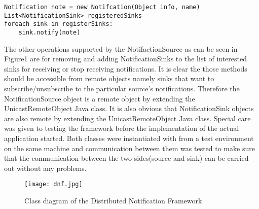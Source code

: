 \documentclass[a4paper,12pt,titlepage]{article}
\begin{document}
\begin{lstlisting}
Notification note = new Notifcation(Object info, name)
List<NotificationSink> registeredSinks
foreach sink in registerSinks:
	sink.notify(note)
\end{lstlisting}
The other operations supported by the NotifactionSource as can be seen in Figure1 are for removing and adding NotificationSinks to the list of interested sinks for receiving or stop receiving notifications. It is clear the those methods should be accessible from remote objects namely sinks that want to subscribe/unsubscribe to the particular source's notifications. Therefore the NotificationSource object is a remote object by extending the UnicastRemoteObject Java class. It is also obvious that NotificationSink objects are also remote by extending the UnicastRemoteObject Java class. Special care was given to testing the framework before the implementation of the actual application started. Both classes were instantiated with from a test environment on the same machine and communication between them was tested to make sure that the communication between the two sides(source and sink) can be carried out without any problems.
\begin{figure}[h!]
  \centering
 \texttt{[image: dnf.jpg]}
\caption{Class diagram of the Distributed Notification Framework}
\end{figure}
\end{document}
